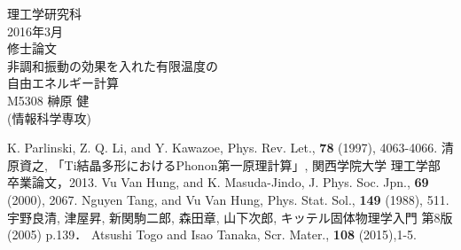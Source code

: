\documentclass[12pt,a4]{jreport}%
\begin{document}
\begin{titlepage}
    \begin{center}
    \null
    \LARGE 理工学研究科\\
            \vspace{1.5cm}
    \LARGE 2016年3月\\
            \vspace{1.5cm}
    \LARGE 修士論文\\
            \vspace{2cm}
    \huge 非調和振動の効果を入れた有限温度の\\自由エネルギー計算\\
            \vspace{6cm}%
    \LARGE M5308   榊原 健\\(情報科学専攻)
    \end{center}
\end{titlepage}



\tableofcontents



\begin{thebibliography}{9}
K. Parlinski, Z. Q. Li, and Y. Kawazoe, Phys. Rev. Let., {\bf 78} (1997), 4063-4066.
清原資之, 「Ti結晶多形におけるPhonon第一原理計算」, 関西学院大学 理工学部 卒業論文，2013. 
Vu Van Hung, and K. Masuda-Jindo, J. Phys. Soc. Jpn., {\bf 69} (2000), 2067.
Nguyen Tang, and Vu Van Hung, Phys. Stat. Sol., {\bf 149} (1988), 511.
宇野良清, 津屋昇, 新関駒二郎, 森田章, 山下次郎, キッテル固体物理学入門 第8版(2005) p.139．
Atsushi Togo and Isao Tanaka, Scr. Mater., {\bf108} (2015),1-5.
\end{thebibliography}
\end{document}
